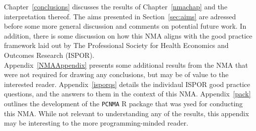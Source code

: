 Chapter~\ref{conclusions} discusses the results of Chapter~\ref{nmachap} and the interpretation thereof. The aims presented in Section~\ref{sec:aims} are adressed before some more general discussion and comments on potential future work. In addition, there is some discussion on how this NMA aligns with the good practice framework laid out by The Professional Society for Health Economics and Outcomes Research (ISPOR).\\

Appendix~\ref{NMAAppendix} presents some additional results from the NMA that were not required for drawing any conclusions, but may be of value to the interested reader. Appendix~\ref{isporqs} details the individaul ISPOR good practice questions, and the answers to them in the context of this NMA. Appendix~\ref{pack} outlines the development of the \verb|PCNMA| R package that was ysed for conducting this NMA. While not relevant to understanding any of the results, this appendix may be interesting to the more programming-minded reader.